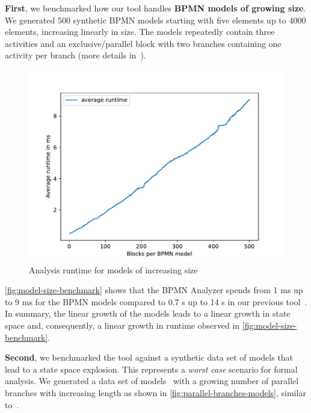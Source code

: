 \documentclass[
twocolumn
]{ceurart}
\begin{document}
\textbf{First}, we benchmarked how our tool handles \textbf{BPMN models of growing size}.
We generated 500 synthetic BPMN models starting with five elements up to 4000 elements, increasing linearly in size.
The models repeatedly contain three activities and an exclusive/parallel block with two branches containing one activity per branch (more details in~\cite{krauterInstantaneousComprehensibleFixable2024}).

\begin{figure}[ht]
	\centering
	\includegraphics[width=1\linewidth]{images/model-size-benchmark}
	\caption{Analysis runtime for models of increasing size}
	\label{fig:model-size-benchmark}
\end{figure}

\autoref{fig:model-size-benchmark} shows that the BPMN Analyzer spends from 1 ms up to 9 ms for the BPMN models compared to 0.7 s up to 14 s in our previous tool~\cite{krauterFormalizationAnalysisBPMN2023}.
In summary, the linear growth of the models leads to a linear growth in state space and, consequently, a linear growth in runtime observed in \autoref{fig:model-size-benchmark}.

\textbf{Second}, we benchmarked the tool against a synthetic data set of models that lead to a state space explosion.
This represents a \textit{worst case} scenario for formal analysis.
We generated a data set of models~\cite{krauterInstantaneousComprehensibleFixable2024} with a growing number of parallel branches with increasing length as shown in \autoref{fig:parallel-branches-models}, similar to~\cite{corradiniFormalApproachAnalysis2021}.
\end{document}
